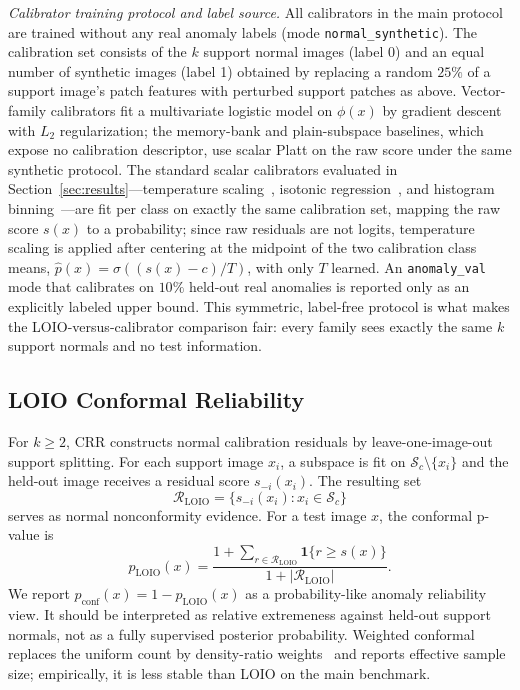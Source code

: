 \emph{Calibrator training protocol and label source.} All calibrators in the main protocol are trained without any real anomaly labels (mode \texttt{normal\_synthetic}). The calibration set consists of the $k$ support normal images (label 0) and an equal number of synthetic images (label 1) obtained by replacing a random $25\%$ of a support image's patch features with perturbed support patches as above. Vector-family calibrators fit a multivariate logistic model on $\phi(x)$ by gradient descent with $L_2$ regularization; the memory-bank and plain-subspace baselines, which expose no calibration descriptor, use scalar Platt on the raw score under the same synthetic protocol. The standard scalar calibrators evaluated in Section~\ref{sec:results}---temperature scaling~\cite{guo2017calibration}, isotonic regression~\cite{zadrozny2002transforming}, and histogram binning~\cite{zadrozny2001obtaining}---are fit per class on exactly the same calibration set, mapping the raw score $s(x)$ to a probability; since raw residuals are not logits, temperature scaling is applied after centering at the midpoint of the two calibration class means, $\hat{p}(x)=\sigma((s(x)-c)/T)$, with only $T$ learned. An \texttt{anomaly\_val} mode that calibrates on $10\%$ held-out real anomalies is reported only as an explicitly labeled upper bound. This symmetric, label-free protocol is what makes the LOIO-versus-calibrator comparison fair: every family sees exactly the same $k$ support normals and no test information.

\subsection{LOIO Conformal Reliability}
For $k\ge2$, CRR constructs normal calibration residuals by leave-one-image-out support splitting. For each support image $x_i$, a subspace is fit on $\mathcal{S}_c\setminus\{x_i\}$ and the held-out image receives a residual score $s_{-i}(x_i)$. The resulting set
\begin{equation}\label{eq:rloio}
    \mathcal{R}_{\mathrm{LOIO}}=\{s_{-i}(x_i):x_i\in\mathcal{S}_c\}
\end{equation}
serves as normal nonconformity evidence. For a test image $x$, the conformal p-value is
\begin{equation}\label{eq:loio}
    p_{\mathrm{LOIO}}(x)=\frac{1+\sum_{r\in\mathcal{R}_{\mathrm{LOIO}}}\mathbf{1}\{r\ge s(x)\}}{1+|\mathcal{R}_{\mathrm{LOIO}}|}.
\end{equation}
We report $p_{\mathrm{conf}}(x)=1-p_{\mathrm{LOIO}}(x)$ as a probability-like anomaly reliability view. It should be interpreted as relative extremeness against held-out support normals, not as a fully supervised posterior probability. Weighted conformal replaces the uniform count by density-ratio weights~\cite{tibshirani2019covariate} and reports effective sample size; empirically, it is less stable than LOIO on the main benchmark.

